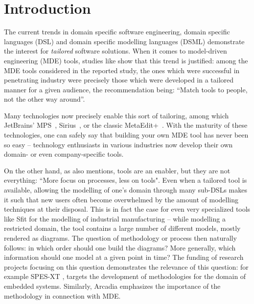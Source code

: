 \section{Introduction}
\label{sec:intro}
\vspace{-.3cm}
The current trends in domain specific software engineering, domain specific
languages (DSL) and domain specific modelling languages (DSML) demonstrate the
interest for \emph{tailored} software solutions.
When it comes to model-driven engineering (MDE) tools, studies like \cite{DBLP:conf/models/WhittleHRBH13} 
show that this trend is justified: among the MDE tools considered
in the reported study, the ones which were successful in penetrating industry
were precisely those which were developed in a tailored manner for a given
audience, the recommendation being: ``Match tools to people, not the other way
around''.

Many technologies now precisely enable this sort of tailoring, among which 
JetBrains' MPS~\cite{DBLP:conf/pppj/PechSV13},
Sirius~\cite{DBLP:conf/asplos/HauswaldLZLRKDM15}, or the classic MetaEdit+~\cite{DBLP:conf/sle/Tolvanen16}.
With the maturity of these technologies, one can safely say that building your own MDE tool
has never been so easy -- technology enthusiasts in various industries now
develop their own domain- or even company-specific tools.

On the other hand, as \cite{DBLP:conf/models/WhittleHRBH13} also mentions, tools
are an enabler, but they are not everything: ``More focus on processes, less on
tools".
Even when a tailored tool is available, allowing the modelling of one's domain
through many sub-DSLs makes it such that new users often become overwhelmed by
the amount of modelling techniques at their disposal. This is in fact the case
for even very specialized tools like Sfit \cite{DBLP:conf/vamos/BayhaLAMI16} for
the modelling of industrial manufacturing -- while modelling a restricted
domain, the tool contains a large number of different models, mostly rendered as
diagrams. The question of methodology or process then naturally follows: in
which order should one build the diagrams? More generally, which information
should one model at a given point in time? The funding of research projects
focusing on this question demonstrates the relevance of this question: for
example SPES-XT \cite{DBLP:books/sp/spes2016}, targets the development of
methodologies for the domain of embedded systems.
Similarly, Arcadia \cite{DBLP:conf/syscon/BonnetVEN16} emphasizes the importance
of the methodology in connection with MDE.

